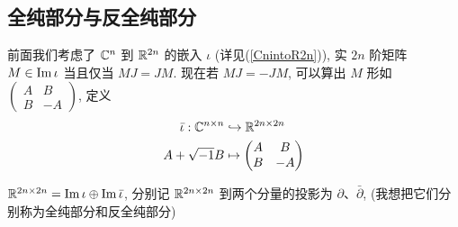         \subsection{全纯部分与反全纯部分} 
            前面我们考虑了 $\mathbb{C}^n$ 到 $\mathbb{R}^{2n}$ 的嵌入 $\iota$ (详见(\ref{CnintoR2n})), 实 $2n$ 阶矩阵 $M\in{\rm Im}\,\iota$ 当且仅当 $MJ=JM$.
            现在若 $MJ=-JM$, 可以算出 $M$ 形如 $\begin{pmatrix} A & B \\ B & -A \end{pmatrix}$, 定义
            \begin{equation}\label{CnintoR2n-anti}
                \begin{aligned}
                    \bar{\iota}:\mathbb{C}^{n\times n} &   \hookrightarrow\mathbb{R}^{2n\times2n} \\
                    A + \sqrt{-1} B                   &   \mapsto \begin{pmatrix} A & B \\ B & -A \end{pmatrix}
                \end{aligned}
            \end{equation}
            \begin{proposition}
                $\mathbb{R}^{2n\times2n} = {\rm Im}\,\iota\oplus{\rm Im}\,\bar{\iota}$, 分别记 $\mathbb{R}^{2n\times2n}$ 到两个分量的投影为 $\partial$、$\bar{\partial}$, 
                (我想把它们分别称为全纯部分和反全纯部分)
            \end{proposition}
